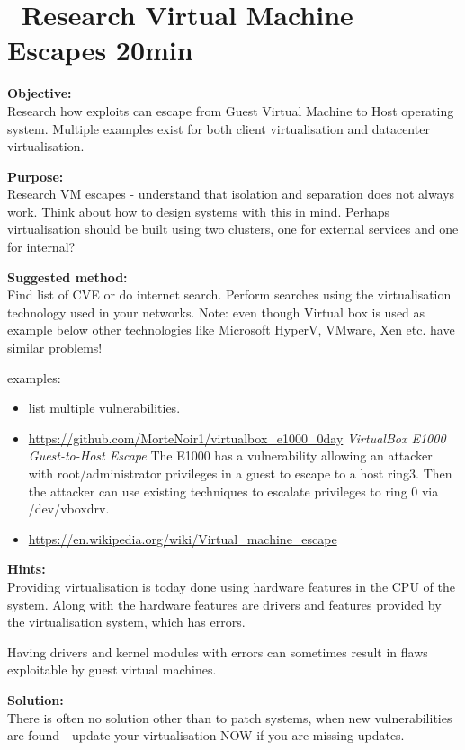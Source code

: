 \documentclass[a4paper,11pt,notitlepage]{report}
\begin{document}
\chapter{\faExclamationTriangle\ Research Virtual Machine Escapes 20min}
\label{ex:vm-escape}


{\bf Objective:}\\
Research how exploits can escape from Guest Virtual Machine to Host operating system. Multiple examples exist for both client virtualisation and datacenter virtualisation.

{\bf Purpose:}\\
Research VM escapes - understand that isolation and separation does not always work. Think about how to design systems with this in mind. Perhaps virtualisation should be built using two clusters, one for external services and one for internal?

{\bf Suggested method:}\\
Find list of CVE or do internet search. Perform searches using the virtualisation technology used in your networks. Note: even though Virtual box is used as example below other technologies like Microsoft HyperV, VMware, Xen etc. have similar problems!


examples:

\begin{itemize}
\item {} list multiple vulnerabilities.
\item \url{https://github.com/MorteNoir1/virtualbox_e1000_0day} \emph{VirtualBox E1000 Guest-to-Host Escape} The E1000 has a vulnerability allowing an attacker with root/administrator privileges in a guest to escape to a host ring3. Then the attacker can use existing techniques to escalate privileges to ring 0 via /dev/vboxdrv.
\item \url{https://en.wikipedia.org/wiki/Virtual_machine_escape}
\end{itemize}

{\bf Hints:}\\
Providing virtualisation is today done using hardware features in the CPU of the system. Along with the hardware features are drivers and features provided by the virtualisation system, which has errors.

Having drivers and kernel modules with errors can sometimes result in flaws exploitable by guest virtual machines.

{\bf Solution:}\\
There is often no solution other than to patch systems, when new vulnerabilities are found - update your virtualisation NOW if you are missing updates.
\end{document}
